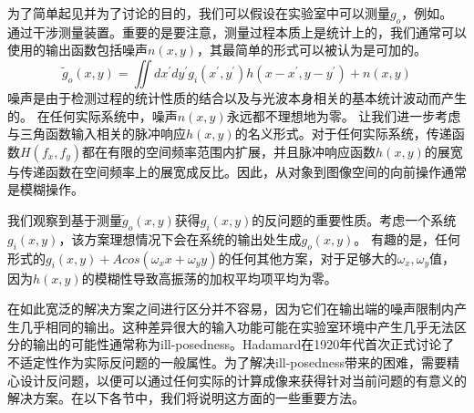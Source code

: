 \documentclass[12pt, UTF8]{ctexart}%
\numberwithin{equation}{section}
\numberwithin{figure}{section}
\newcommand{\InsertEqution}[2]{\begin{equation}
  \label{#1}
   #2
 \end{equation}}
\newcommand{\InsertInlineEq}[1]{$#1$}
\begin{document}
\begin{sloppypar}
为了简单起见并为了讨论的目的，我们可以假设在实验室中可以测量\InsertInlineEq{g_o}，例如。 通过干涉测量装置。重要的是要注意，测量过程本质上是统计上的，我们通常可以使用的输出函数包括噪声\InsertInlineEq{n(x,y)}，其最简单的形式可以被认为是可加的。
\InsertEqution{5.6}{\tilde{g}_{o}(x, y)=\iint d x^{\prime} d y^{\prime} g_{i}\left(x^{\prime}, y^{\prime}\right) h\left(x-x^{\prime}, y-y^{\prime}\right)+n(x, y)}
噪声是由于检测过程的统计性质的结合以及与光波本身相关的基本统计波动而产生的。 在任何实际系统中，噪声\InsertInlineEq{n(x,y)}永远都不理想地为零。 让我们进一步考虑与三角函数输入相关的脉冲响应\InsertInlineEq{h(x,y)}的名义形式。对于任何实际系统，传递函数\InsertInlineEq{H(f_x,f_y)}都在有限的空间频率范围内扩展，并且脉冲响应函数\InsertInlineEq{h(x,y)}的展宽与传递函数在空间频率上的展宽成反比。因此，从对象到图像空间的向前操作通常是模糊操作。

我们观察到基于测量\InsertInlineEq{\tilde{g}_{o}(x, y)}获得\InsertInlineEq{g_i(x,y)}的反问题的重要性质。考虑一个系统\InsertInlineEq{g_i(x,y)}，该方案理想情况下会在系统的输出处生成\InsertInlineEq{g_o(x,y)}。 有趣的是，任何形式的\InsertInlineEq{g_i(x,y)+Acos(\omega_x x+\omega_y y)}的任何其他方案，对于足够大的\InsertInlineEq{\omega_x,\omega_y}值，因为\InsertInlineEq{h(x,y)}的模糊性导致高振荡的加权平均项平均为零。

在如此宽泛的解决方案之间进行区分并不容易，因为它们在输出端的噪声限制内产生几乎相同的输出。这种差异很大的输入功能可能在实验室环境中产生几乎无法区分的输出的可能性通常称为ill-posedness。Hadamard在1920年代首次正式讨论了不适定性作为实际反问题的一般属性。为了解决ill-posedness带来的困难，需要精心设计反问题，以便可以通过任何实际的计算成像来获得针对当前问题的有意义的解决方案。在以下各节中，我们将说明这方面的一些重要方法。


\end{sloppypar}
\end{document}
